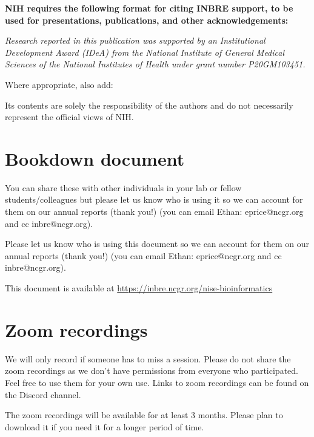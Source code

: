 \documentclass[
]{book}
\begin{document}
{\textbf{NIH requires the following format for citing INBRE support, to be used for presentations, publications, and other acknowledgements:}}

{\emph{Research reported in this publication was supported by an Institutional Development Award (IDeA) from the National Institute of General Medical Sciences of the National Institutes of Health under grant number P20GM103451.}}

{Where appropriate, also add:}

{Its contents are solely the responsibility of the authors and do not necessarily represent the official views of NIH.}

\hypertarget{bookdown-document}{%
\section{Bookdown document}\label{bookdown-document}}

You can share these with other individuals in your lab or fellow students/colleagues but please let us know who is using it so we can account for them on our annual reports (thank you!) (you can email Ethan: eprice@ncgr.org and cc inbre@ncgr.org).

Please let us know who is using this document so we can account for them on our annual reports (thank you!) (you can email Ethan: eprice@ncgr.org and cc inbre@ncgr.org).

This document is available at \url{https://inbre.ncgr.org/nise-bioinformatics}

\hypertarget{zoom-recordings}{%
\section{Zoom recordings}\label{zoom-recordings}}

We will only record if someone has to miss a session. Please do not share the zoom recordings as we don't have permissions from everyone who participated. Feel free to use them for your own use. Links to zoom recordings can be found on the Discord channel.

The zoom recordings will be available for at least 3 months. Please plan to download it if you need it for a longer period of time.

  
\end{document}
